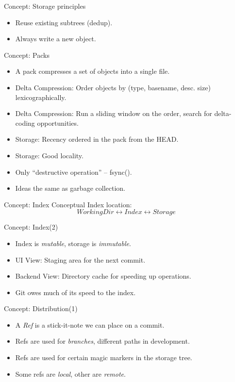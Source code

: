 \documentclass[xcolor=pdftex,dvipsnames]{beamer}
\begin{document}
\begin{frame}{Concept: Storage principles}
  \begin{itemize}
  \item Reuse existing subtrees (dedup).
  \item Always write a new object.
  \end{itemize}
\end{frame}
\begin{frame}{Concept: Packs}
  \begin{itemize}
  \item A pack compresses a set of objects into a single file.
  \item Delta Compression: Order objects by (type, basename,
    desc. size) lexicographically.
  \item Delta Compression: Run a sliding window on the order, search
    for delta-coding opportunities.
  \item Storage: Recency ordered in the pack from the HEAD.
  \item Storage: Good locality.
  \item Only ``destructive operation'' -- fsync().
  \item Ideas the same as garbage collection.
  \end{itemize}
\end{frame}
\begin{frame}{Concept: Index}
Conceptual Index location:
$$
  WorkingDir \leftrightarrow Index \leftrightarrow Storage
$$
\end{frame}
\begin{frame}{Concept: Index(2)}
  \begin{itemize}
  \item Index is \emph{mutable}, storage is \emph{immutable}.
  \item UI View: Staging area for the next commit.
  \item Backend View: Directory cache for speeding up operations.
  \item Git owes much of its speed to the index.
  \end{itemize}
\end{frame}
\begin{frame}{Concept: Distribution(1)}
  \begin{itemize}
  \item A \emph{Ref} is a stick-it-note we can place on a commit.
  \item Refs are used for \emph{branches}, different paths in development.
  \item Refs are used for certain magic markers in the storage tree.
  \item Some refs are \emph{local}, other are \emph{remote}.
  \end{itemize}
\end{frame}
\end{document}
